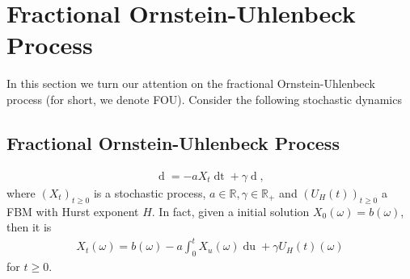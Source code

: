 \documentclass[a4paper, twoside, 11pt]{article}
\theoremstyle{definition}
\newtheorem{definition}{\scshape Definition}[section]
\newtheorem{theorem}[definition]{\scshape Theorem}
\begin{document}



\newpage
\section{Fractional Ornstein-Uhlenbeck Process}
\setcounter{equation}{0}
In this section we turn our attention on the fractional Ornstein-Uhlenbeck process (for short, we denote FOU). Consider the following stochastic dynamics
\subsection{Fractional Ornstein-Uhlenbeck Process}
\begin{eqnarray}
  \mathop{dX_t} = -aX_t\mathop{dt} + \gamma \mathop{dU_H(t)},
\end{eqnarray}
where $(X_t)_{t\ge 0}$ is a stochastic process, $a\in\mathbb{R}, \gamma\in\mathbb{R}_{+}$ and $(U_H(t))_{t\ge 0} $ a FBM with Hurst exponent $H$. In fact, given a initial solution $X_0(\omega)=b(\omega)$, then it is
\begin{eqnarray}
  X_t(\omega) = b(\omega) - a\int_0^t X_u(\omega) \mathop{du} + \gamma U_H(t)(\omega)
  \label{sec:oup}
\end{eqnarray}
for $t \ge 0$.
\end{document}
